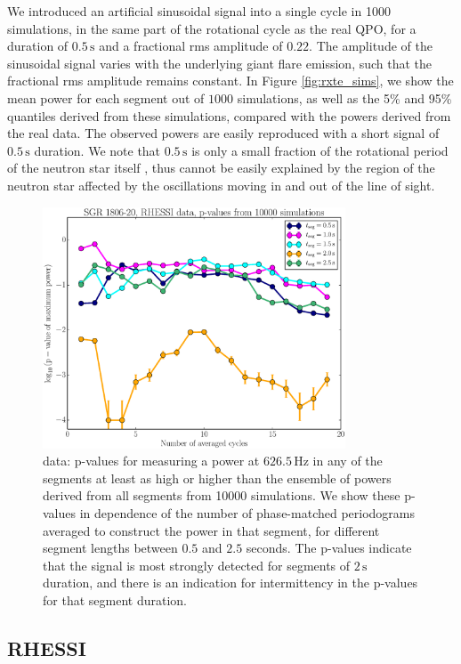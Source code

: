 \documentclass{emulateapj}
\begin{document}
We introduced an artificial sinusoidal signal into a single cycle in 1000 simulations, in the same part of the rotational cycle as the real QPO, for a duration of $0.5\, \mathrm{s}$ and a fractional rms amplitude of $0.22$. The amplitude of the sinusoidal signal varies with the underlying giant flare emission, such that the fractional rms amplitude remains constant. In Figure \ref{fig:rxte_sims}, we show the mean power for each segment out of $1000$ simulations, as well as the 5\% and 95\% quantiles derived from these simulations, compared with the powers derived from the real data. The observed powers are easily reproduced with a short signal of $0.5\, \mathrm{s}$ duration. We note that $0.5\,\mathrm{s}$ is only a small fraction of the rotational period of the neutron star itself \citep[$7.5477 \,\mathrm{s}$,][]{Woods07}, thus cannot be easily explained by the region of the neutron star affected by the oscillations moving in and out of the line of sight.
\begin{figure}[htbp]
\begin{center}
\includegraphics[width=9cm]{f4.eps}
\caption{\rhessi data: p-values for measuring a power at $626.5\, \mathrm{Hz}$ in any of the segments at least as high or higher than the ensemble of powers derived from all segments from 10000 simulations. We show these p-values in dependence of the number of phase-matched periodograms averaged to construct the power in that segment, for different segment lengths between $0.5$ and $2.5$ seconds. The p-values indicate that the signal is most strongly detected for segments of $2\,\mathrm{s}$ duration, and there is an indication for intermittency in the p-values for that segment duration.}
\label{fig:rhessi_pvalues}
\end{center}
\end{figure}
\subsection{RHESSI}
\label{sec:rhessi_results}
\end{document}
